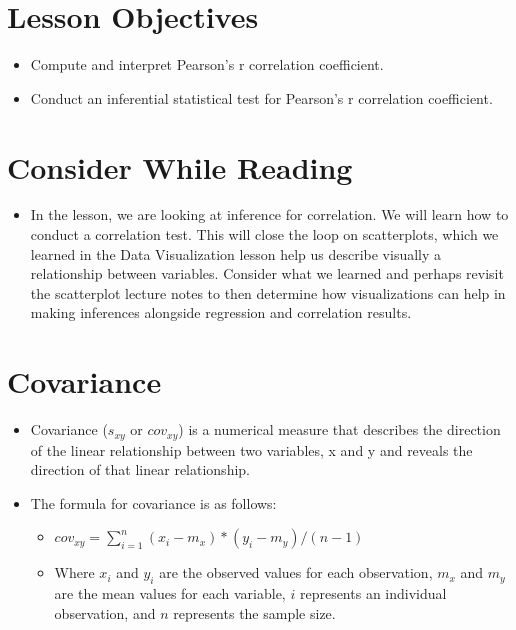 \documentclass[
  letterpaper,
  DIV=11,
  numbers=noendperiod]{scrreprt}
\providecommand{\tightlist}{%
  \setlength{\itemsep}{0pt}\setlength{\parskip}{0pt}}\usepackage{longtable,booktabs,array}
\begin{document}
\section{Lesson Objectives}\label{lesson-objectives-8}

\begin{itemize}
\tightlist
\item
  Compute and interpret Pearson's r correlation coefficient.
\item
  Conduct an inferential statistical test for Pearson's r correlation
  coefficient.
\end{itemize}

\section{Consider While Reading}\label{consider-while-reading-8}

\begin{itemize}
\tightlist
\item
  In the lesson, we are looking at inference for correlation. We will
  learn how to conduct a correlation test. This will close the loop on
  scatterplots, which we learned in the Data Visualization lesson help
  us describe visually a relationship between variables. Consider what
  we learned and perhaps revisit the scatterplot lecture notes to then
  determine how visualizations can help in making inferences alongside
  regression and correlation results.
\end{itemize}

\section{Covariance}\label{covariance}

\begin{itemize}
\tightlist
\item
  Covariance (\(s_{xy}\) or \(cov_{xy}\)) is a numerical measure that
  describes the direction of the linear relationship between two
  variables, x and y and reveals the direction of that linear
  relationship.
\item
  The formula for covariance is as follows:

  \begin{itemize}
  \tightlist
  \item
    \(cov_{xy} = \sum^n_{i=1}(x_i-m_x)*(y_i-m_y)/(n-1)\)
  \item
    Where \(x_i\) and \(y_i\) are the observed values for each
    observation, \(m_x\) and \(m_y\) are the mean values for each
    variable, \(i\) represents an individual observation, and \(n\)
    represents the sample size.
  \end{itemize}
\end{itemize}
\end{document}
